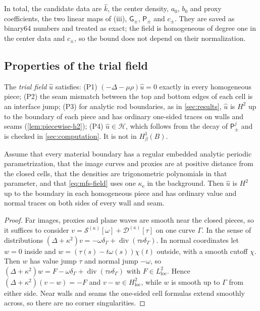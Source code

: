 In total, the candidate data are $\widehat k$, the center density, $a_0$, $b_0$
and proxy coefficients, the two linear maps of (iii), $\mathsf G_\pm$,
$\mathsf P_\pm$ and $c_\pm$. They are saved as binary64 numbers and treated as
exact; the field is homogeneous of degree one in the center data and $c_\pm$, so
the bound does not depend on their normalization.

\subsection{Properties of the trial field}\label{sec:field-properties}
The \emph{trial field} $\widehat u$ satisfies:
(P1) $(-\Delta-\mu\rho)\widehat u=0$ exactly in every homogeneous piece;
(P2) the seam mismatch between the top and bottom edges of each cell is an
interface jump;
(P3) for analytic rod boundaries, as in \cref{sec:results}, $\widehat u$ is $H^2$
up to the boundary of each piece and has ordinary one-sided traces on walls and
seams (\cref{lem:piecewise-h2});
(P4) $\widehat u\in\mathcal H$, which follows from the decay of $\mathsf P_\pm^j$
and is checked in \cref{sec:computation}.
It is not in $H^1_\beta(B)$.

\begin{lemma}\label{lem:piecewise-h2}
Assume that every material boundary has a regular embedded analytic periodic
parametrization, that the image curves and proxies are at positive distance from
the closed cells, that the densities are trigonometric polynomials in that
parameter, and that \eqref{eq:mfs-field} uses one $\kappa_{\mathrm e}$ in the
background. Then $\widehat u$ is $H^2$ up to the boundary in each homogeneous
piece and has ordinary value and normal traces on both sides of every wall and
seam.
\end{lemma}

\begin{proof}
Far images, proxies and plane waves are smooth near the closed pieces, so it
suffices to consider $v=\mathcal S^{(\kappa)}[\omega]+\mathcal D^{(\kappa)}[\tau]$ on
one curve $\Gamma$. In the sense of distributions $(\Delta+\kappa^2)v=
-\omega\delta_\Gamma+\operatorname{div}(\tau\nu\delta_\Gamma)$. In normal coordinates
let $w=0$ inside and $w=(\tau(s)-t\omega(s))\chi(t)$ outside, with a smooth cutoff
$\chi$. Then $w$ has value jump $\tau$ and normal jump $-\omega$, so
$(\Delta+\kappa^2)w=F-\omega\delta_\Gamma+\operatorname{div}(\tau\nu\delta_\Gamma)$ with
$F\in L^2_{\mathrm{loc}}$. Hence $(\Delta+\kappa^2)(v-w)=-F$ and $v-w\in
H^2_{\mathrm{loc}}$, while $w$ is smooth up to $\Gamma$ from either side. Near walls
and seams the one-sided cell formulas extend smoothly across, so there are no
corner singularities.
\end{proof}
